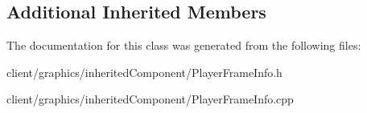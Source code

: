 \subsection*{Additional Inherited Members}


The documentation for this class was generated from the following files\-:\begin{DoxyCompactItemize}
\item 
client/graphics/inherited\-Component/Player\-Frame\-Info.\-h\item 
client/graphics/inherited\-Component/Player\-Frame\-Info.\-cpp\end{DoxyCompactItemize}
